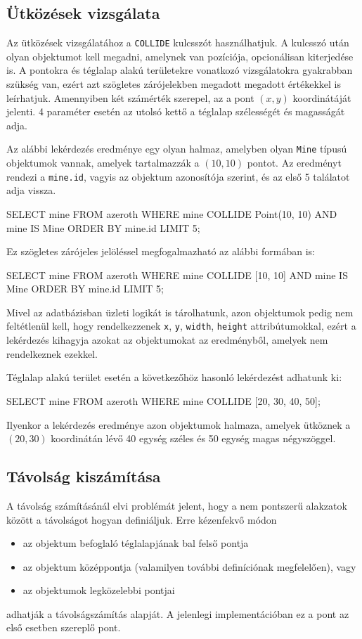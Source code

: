\subsection{Ütközések vizsgálata}

Az ütközések vizsgálatához a \texttt{COLLIDE} kulcsszót használhatjuk. A kulcsszó után olyan objektumot kell megadni, amelynek van pozíciója, opcionálisan kiterjedése is. A pontokra és téglalap alakú területekre vonatkozó vizsgálatokra gyakrabban szükség van, ezért azt szögletes zárójelekben megadott megadott értékekkel is leírhatjuk. Amennyiben két számérték szerepel, az a pont $(x, y)$ koordinátáját jelenti. 4 paraméter esetén az utolsó kettő a téglalap szélességét és magasságát adja.

Az alábbi lekérdezés eredménye egy olyan halmaz, amelyben olyan \texttt{Mine} típusú objektumok vannak, amelyek tartalmazzák a $(10, 10)$ pontot. Az eredményt rendezi a \texttt{mine.id}, vagyis az objektum azonosítója szerint, és az első 5 találatot adja vissza.
\begin{sql}
SELECT mine
FROM azeroth
WHERE mine COLLIDE Point(10, 10) AND mine IS Mine
ORDER BY mine.id
LIMIT 5;
\end{sql}
Ez szögletes zárójeles jelöléssel megfogalmazható az alábbi formában is:
\begin{sql}
SELECT mine
FROM azeroth
WHERE mine COLLIDE [10, 10] AND mine IS Mine
ORDER BY mine.id
LIMIT 5;
\end{sql}
Mivel az adatbázisban üzleti logikát is tárolhatunk, azon objektumok pedig nem feltétlenül kell, hogy rendelkezzenek \texttt{x}, \texttt{y}, \texttt{width}, \texttt{height} attribútumokkal, ezért a lekérdezés kihagyja azokat az objektumokat az eredményből, amelyek nem rendelkeznek ezekkel.

Téglalap alakú terület esetén a következőhöz hasonló lekérdezést adhatunk ki:
\begin{sql}
SELECT mine
FROM azeroth
WHERE mine COLLIDE [20, 30, 40, 50];
\end{sql}
Ilyenkor a lekérdezés eredménye azon objektumok halmaza, amelyek ütköznek a $(20, 30)$ koordinátán lévő 40 egység széles és 50 egység magas négyszöggel.

\subsection{Távolság kiszámítása}

A távolság számításánál elvi problémát jelent, hogy a nem pontszerű alakzatok között a távolságot hogyan definiáljuk. Erre kézenfekvő módon
\begin{itemize}
\item az objektum befoglaló téglalapjának bal felső pontja
\item az objektum középpontja (valamilyen további definíciónak megfelelően), vagy
\item az objektumok legközelebbi pontjai
\end{itemize}
adhatják a távolságszámítás alapját. A jelenlegi implementációban ez a pont az első esetben szereplő pont.

